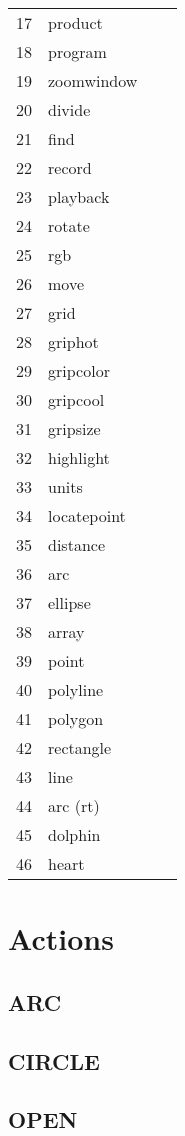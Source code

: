 \begin{longtable}{l l l p{8cm}}
17 & \index{product}product & & \\
18 & \index{program}program & & \\
19 & \index{zoomwindow}zoomwindow & & \\
20 & \index{divide}divide & & \\
21 & \index{find}find & & \\
22 & \index{record}record & & \\
23 & \index{playback}playback & & \\
24 & \index{rotate}rotate & & \\
25 & \index{rgb}rgb & & \\
26 & \index{move}move & & \\
27 & \index{grid}grid & & \\
28 & \index{griphot}griphot &  &  \\
29 & \index{gripcolor}gripcolor & & \\
30 & \index{gripcool}gripcool &  &  \\
31 & \index{gripsize}gripsize &  &  \\
32 & \index{highlight}highlight &  &  \\
33 & \index{units}units &  &  \\
34 & \index{locatepoint}locatepoint &  &  \\
35 & \index{distance}distance &  &  \\
36 & \index{arc}arc &  &  \\
37 & \index{ellipse}ellipse &  &  \\
38 & \index{array}array &  &  \\
39 & \index{point}point &  &  \\
40 & \index{polyline}polyline &  &  \\
41 & \index{polygon}polygon &  &  \\
42 & \index{rectangle}rectangle &  &  \\
43 & \index{line}line &  &  \\
44 & \index{arc-rt}arc (rt) &  &  \\
45 & \index{dolphin}dolphin &  &  \\
46 & \index{heart}heart  & &
\end{longtable}

\section{Actions}

\subsection{ARC}

\subsection{CIRCLE}

\subsection{OPEN}
